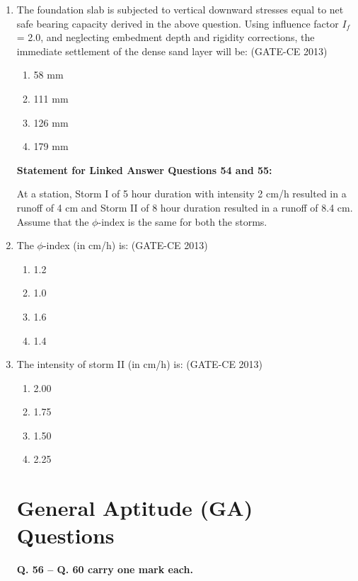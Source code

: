 \documentclass[journal,12pt,onecolumn]{article}
\theoremstyle{remark}
\begin{document}
\begin{enumerate}
    \item The foundation slab is subjected to vertical downward stresses equal to net safe bearing capacity derived in the above question. Using influence factor $I_f$ = 2.0, and neglecting embedment depth and rigidity corrections, the immediate settlement of the dense sand layer will be: (GATE-CE 2013)
    \begin{multicols}{4}
    \begin{enumerate}
        \item 58 mm 
        \item 111 mm 
        \item 126 mm 
        \item 179 mm
    \end{enumerate}
    \end{multicols}

    \textbf{Statement for Linked Answer Questions 54 and 55:}

    At a station, Storm I of 5 hour duration with intensity 2 cm/h resulted in a runoff of 4 cm and Storm II of 8 hour duration resulted in a runoff of 8.4 cm. Assume that the $\phi$-index is the same for both the storms.
    
    \item The $\phi$-index (in cm/h) is: (GATE-CE 2013)
    \begin{multicols}{4}
    \begin{enumerate}
        \item 1.2 
        \item 1.0 
        \item 1.6 
        \item 1.4
    \end{enumerate}
    \end{multicols}
    
    \item The intensity of storm II (in cm/h) is: (GATE-CE 2013)
    \begin{multicols}{4}
    \begin{enumerate}
        \item 2.00 
        \item 1.75 
        \item 1.50 
        \item 2.25
    \end{enumerate}
    \end{multicols}

\section*{General Aptitude (GA) Questions}
\textbf{Q. 56 -- Q. 60 carry one mark each.}
 

\end{enumerate}
\end{document}
